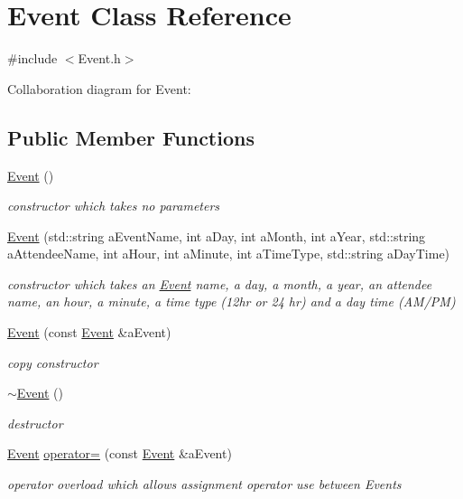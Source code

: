 \hypertarget{classEvent}{}\section{Event Class Reference}
\label{classEvent}


{\ttfamily \#include $<$Event.\+h$>$}



Collaboration diagram for Event\+:
\subsection*{Public Member Functions}
\begin{DoxyCompactItemize}
\item 
\hyperlink{classEvent_a5a40dd4708297f7031e29b39e039ae10}{Event} ()
\begin{DoxyCompactList}\small\item\em constructor which takes no parameters \end{DoxyCompactList}\item 
\hyperlink{classEvent_a489bf3013e87a5dddb1cfd027dd6856c}{Event} (std\+::string a\+Event\+Name, int a\+Day, int a\+Month, int a\+Year, std\+::string a\+Attendee\+Name, int a\+Hour, int a\+Minute, int a\+Time\+Type, std\+::string a\+Day\+Time)
\begin{DoxyCompactList}\small\item\em constructor which takes an \hyperlink{classEvent}{Event} name, a day, a month, a year, an attendee name, an hour, a minute, a time type (12hr or 24 hr) and a day time (A\+M/\+PM) \end{DoxyCompactList}\item 
\hyperlink{classEvent_a02962ae1f380b0805431b9642e29c156}{Event} (const \hyperlink{classEvent}{Event} \&a\+Event)
\begin{DoxyCompactList}\small\item\em copy constructor \end{DoxyCompactList}\item 
\hyperlink{classEvent_a7704ec01ce91e673885792054214b3d2}{$\sim$\+Event} ()
\begin{DoxyCompactList}\small\item\em destructor \end{DoxyCompactList}\item 
\hyperlink{classEvent}{Event} \hyperlink{classEvent_a5763ef967f6aba0542972aeb8537e34c}{operator=} (const \hyperlink{classEvent}{Event} \&a\+Event)
\begin{DoxyCompactList}\small\item\em operator overload which allows assignment operator use between Events \end{DoxyCompactList}\item 

\end{DoxyCompactItemize}
